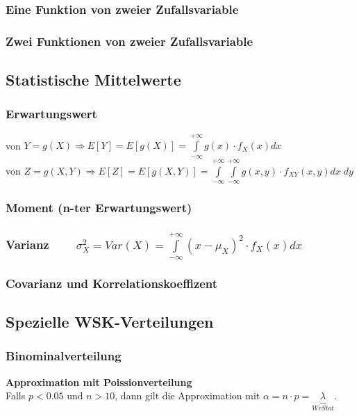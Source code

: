 \subsubsection{Eine Funktion von zweier Zufallsvariable }
\subsubsection{Zwei Funktionen von zweier Zufallsvariable }
\vspace{0.25cm}

\subsection{Statistische Mittelwerte }
\subsubsection{Erwartungswert } 
	\vspace{-0.2cm} \hspace*{0.2cm}
	\parbox{16cm}{von $Y = g(X) \Rightarrow E[Y] = E[g(X)] = \int\limits_{-\infty}^{+\infty}g(x)\cdot f_X(x) d x$ \\ 
	von $Z = g(X,Y) \Rightarrow E[Z] = E[g(X,Y)] = \int\limits_{-\infty}^{+\infty}\int\limits_{-\infty}^{+\infty} g(x,y) \cdot f_{XY}(x,y) dx \; dy$}
	\vspace{-0.2cm}
\subsubsection{Moment (n-ter Erwartungswert) }
\subsubsection{Varianz  $\qquad \sigma_X^2 = Var(X) = \int\limits_{-\infty}^{+\infty}(x-\mu_X)^2\cdot f_X(x) dx$}
\subsubsection{Covarianz und Korrelationskoeffizent }
\vspace{0.25cm}

\subsection{Spezielle WSK-Verteilungen }
\subsubsection{Binominalverteilung }\label{binominalverteilung}
\textbf{Approximation mit Poissionverteilung} \\
\hspace*{0.2cm} Falls $p < 0.05$ und $n > 10$, dann gilt die Approximation mit $\alpha = n \cdot p = \underbrace{\lambda}_{WrStat}$. \\
\vspace{-0.3cm}

